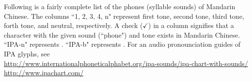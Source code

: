 ﻿%

Following is a fairly complete list of the phones (syllable sounds) of Mandarin Chinese.%
The columns ``1, 2, 3, 4, n" represent
first tone, second tone, third tone, forth tone, and neutral, respectively.
A check ($\checkmark$) in a column signifies that a character with
the given sound (``phone") and tone exists in Mandarin Chinese.
``IPA-n" represents .
``IPA-b" represents .
For an audio pronounciation guides of IPA glyphs, see
\\\indentx\url{http://www.internationalphoneticalphabet.org/ipa-sounds/ipa-chart-with-sounds/}
\\\indentx\url{http://www.ipachart.com/}

